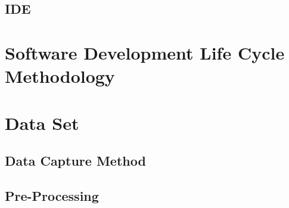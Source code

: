 	\subsection{IDE}
	
	\section{Software Development Life Cycle Methodology}
	
	
	\section{Data Set}
	
	\subsection{Data Capture Method}
	
	\subsection{Pre-Processing}
	
	
	